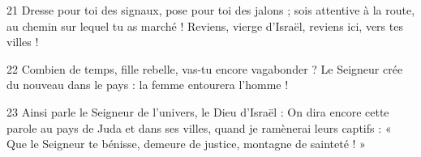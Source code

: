 
21 Dresse pour toi des signaux, pose pour toi des jalons ; sois attentive à la route, au chemin sur lequel tu as marché ! Reviens, vierge d’Israël, reviens ici, vers tes villes !

22 Combien de temps, fille rebelle, vas-tu encore vagabonder ? Le Seigneur crée du nouveau dans le pays : la femme entourera l’homme !

23 Ainsi parle le Seigneur de l’univers, le Dieu d’Israël : On dira encore cette parole au pays de Juda et dans ses villes, quand je ramènerai leurs captifs : « Que le Seigneur te bénisse, demeure de justice, montagne de sainteté ! »